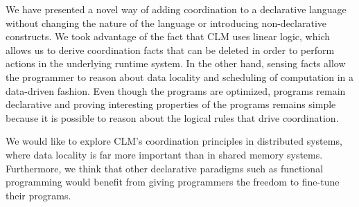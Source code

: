 We have presented a novel way of adding coordination to a declarative language without
changing the nature of the language or introducing non-declarative constructs. We
took advantage of the fact that CLM uses linear logic, which allows us to derive
coordination facts that can be deleted in order to perform actions in the underlying
runtime system. In the other hand, sensing facts allow the programmer to reason
about data locality and scheduling of computation in a data-driven fashion.
Even though the programs are optimized, programs remain declarative and proving
interesting properties of the programs remains simple because it is possible to
reason about the logical rules that drive coordination.

We would like to explore CLM's coordination principles in distributed systems,
where data locality is far more important than in shared memory systems.
Furthermore, we think that other declarative paradigms such as functional
programming would benefit from giving programmers the freedom to fine-tune their
programs.
